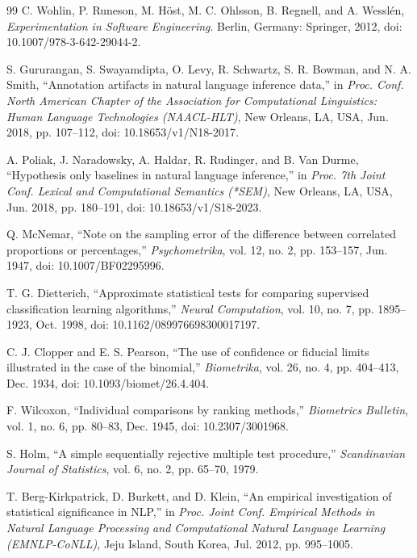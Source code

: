 \begin{thebibliography}{99}
C. Wohlin, P. Runeson, M. H\"ost, M. C. Ohlsson, B. Regnell, and A. Wessl\'en, \textit{Experimentation in Software Engineering}. Berlin, Germany: Springer, 2012, doi: 10.1007/978-3-642-29044-2.

S. Gururangan, S. Swayamdipta, O. Levy, R. Schwartz, S. R. Bowman, and N. A. Smith, ``Annotation artifacts in natural language inference data,'' in \textit{Proc. Conf. North American Chapter of the Association for Computational Linguistics: Human Language Technologies (NAACL-HLT)}, New Orleans, LA, USA, Jun. 2018, pp. 107--112, doi: 10.18653/v1/N18-2017.

A. Poliak, J. Naradowsky, A. Haldar, R. Rudinger, and B. Van Durme, ``Hypothesis only baselines in natural language inference,'' in \textit{Proc. 7th Joint Conf. Lexical and Computational Semantics (*SEM)}, New Orleans, LA, USA, Jun. 2018, pp. 180--191, doi: 10.18653/v1/S18-2023.

Q. McNemar, ``Note on the sampling error of the difference between correlated proportions or percentages,'' \textit{Psychometrika}, vol. 12, no. 2, pp. 153--157, Jun. 1947, doi: 10.1007/BF02295996.

T. G. Dietterich, ``Approximate statistical tests for comparing supervised classification learning algorithms,'' \textit{Neural Computation}, vol. 10, no. 7, pp. 1895--1923, Oct. 1998, doi: 10.1162/089976698300017197.

C. J. Clopper and E. S. Pearson, ``The use of confidence or fiducial limits illustrated in the case of the binomial,'' \textit{Biometrika}, vol. 26, no. 4, pp. 404--413, Dec. 1934, doi: 10.1093/biomet/26.4.404.

F. Wilcoxon, ``Individual comparisons by ranking methods,'' \textit{Biometrics Bulletin}, vol. 1, no. 6, pp. 80--83, Dec. 1945, doi: 10.2307/3001968.

S. Holm, ``A simple sequentially rejective multiple test procedure,'' \textit{Scandinavian Journal of Statistics}, vol. 6, no. 2, pp. 65--70, 1979.

T. Berg-Kirkpatrick, D. Burkett, and D. Klein, ``An empirical investigation of statistical significance in NLP,'' in \textit{Proc. Joint Conf. Empirical Methods in Natural Language Processing and Computational Natural Language Learning (EMNLP-CoNLL)}, Jeju Island, South Korea, Jul. 2012, pp. 995--1005.


\end{thebibliography}
